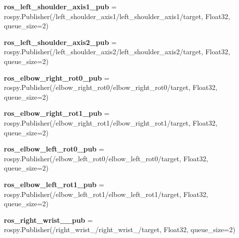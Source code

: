 \begin{DoxyCompactItemize}
\item 
\mbox{\label{namespacedoxytest_a33245a265b429a7431e13f9be481285f}} 
{\bfseries ros\+\_\+left\+\_\+shoulder\+\_\+axis1\+\_\+pub} = rospy.\+Publisher(\textquotesingle{}/left\+\_\+shoulder\+\_\+axis1/left\+\_\+shoulder\+\_\+axis1/target\textquotesingle{}, Float32, queue\+\_\+size=2)
\item 
\mbox{\label{namespacedoxytest_a1c00b06bff5be021d97de118aff3776c}} 
{\bfseries ros\+\_\+left\+\_\+shoulder\+\_\+axis2\+\_\+pub} = rospy.\+Publisher(\textquotesingle{}/left\+\_\+shoulder\+\_\+axis2/left\+\_\+shoulder\+\_\+axis2/target\textquotesingle{}, Float32, queue\+\_\+size=2)
\item 
\mbox{\label{namespacedoxytest_a0bcdb1382444b3890f27f8fc3dfec82e}} 
{\bfseries ros\+\_\+elbow\+\_\+right\+\_\+rot0\+\_\+pub} = rospy.\+Publisher(\textquotesingle{}/elbow\+\_\+right\+\_\+rot0/elbow\+\_\+right\+\_\+rot0/target\textquotesingle{}, Float32, queue\+\_\+size=2)
\item 
\mbox{\label{namespacedoxytest_acb40fc295b0c1045ca25175f7c5fc1d4}} 
{\bfseries ros\+\_\+elbow\+\_\+right\+\_\+rot1\+\_\+pub} = rospy.\+Publisher(\textquotesingle{}/elbow\+\_\+right\+\_\+rot1/elbow\+\_\+right\+\_\+rot1/target\textquotesingle{}, Float32, queue\+\_\+size=2)
\item 
\mbox{\label{namespacedoxytest_a094d613228ee041f143f8810cbcad1b2}} 
{\bfseries ros\+\_\+elbow\+\_\+left\+\_\+rot0\+\_\+pub} = rospy.\+Publisher(\textquotesingle{}/elbow\+\_\+left\+\_\+rot0/elbow\+\_\+left\+\_\+rot0/target\textquotesingle{}, Float32, queue\+\_\+size=2)
\item 
\mbox{\label{namespacedoxytest_a60bf998c38d2acd3360aa93e0fa7b379}} 
{\bfseries ros\+\_\+elbow\+\_\+left\+\_\+rot1\+\_\+pub} = rospy.\+Publisher(\textquotesingle{}/elbow\+\_\+left\+\_\+rot1/elbow\+\_\+left\+\_\+rot1/target\textquotesingle{}, Float32, queue\+\_\+size=2)
\item 
\mbox{\label{namespacedoxytest_ad906238824b2dd48690c9ce4155b7fe3}} 
{\bfseries ros\+\_\+right\+\_\+wrist\+\_\+\_\+pub} = rospy.\+Publisher(\textquotesingle{}/right\+\_\+wrist\+\_/right\+\_\+wrist\+\_/target\textquotesingle{}, Float32, queue\+\_\+size=2)

\end{DoxyCompactItemize}
